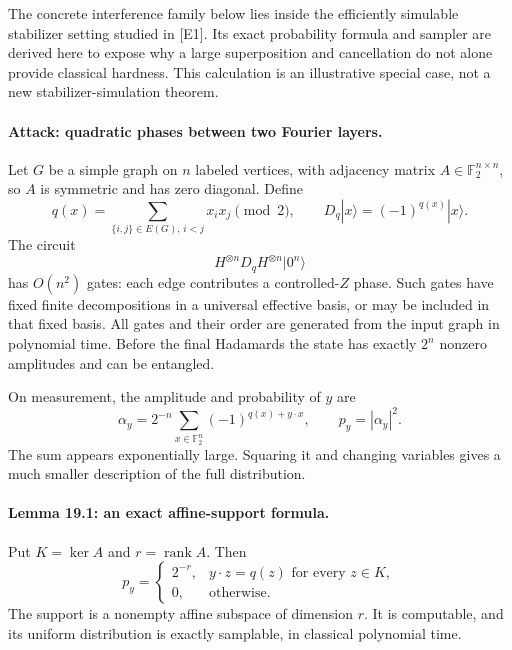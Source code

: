 \documentclass[11pt]{article}
\begin{document}
The concrete interference family below lies inside the efficiently simulable
stabilizer setting studied in [E1]. Its exact probability formula and sampler
are derived here to expose why a large superposition and cancellation do not
alone provide classical hardness. This calculation is an illustrative
special case, not a new stabilizer-simulation theorem.

\paragraph{Attack: quadratic phases between two Fourier layers.}
Let $G$ be a simple graph on $n$ labeled vertices, with adjacency matrix
$A\in\mathbb F_2^{n\times n}$, so $A$ is symmetric and has zero diagonal.
Define
\[
 q(x)=\sum_{\{i,j\}\in E(G),\,i<j}x_i x_j\pmod2,
 \qquad D_q|x\rangle=(-1)^{q(x)}|x\rangle.
\]
The circuit
\[
                 H^{\otimes n}D_qH^{\otimes n}|0^n\rangle
\]
has $O(n^2)$ gates: each edge contributes a controlled-$Z$ phase. Such gates
have fixed finite decompositions in a universal effective basis, or may be
included in that fixed basis. All gates and their order are generated from
the input graph in polynomial time. Before the final Hadamards the state has
exactly $2^n$ nonzero amplitudes and can be entangled.

On measurement, the amplitude and probability of $y$ are
\begin{equation}\label{a19:fourier}
 \alpha_y=2^{-n}\sum_{x\in\mathbb F_2^n}(-1)^{q(x)+y\cdot x},
 \qquad p_y=|\alpha_y|^2.
\end{equation}
The sum appears exponentially large. Squaring it and changing variables
gives a much smaller description of the full distribution.

\paragraph{Lemma 19.1: an exact affine-support formula.}
Put $K=\ker A$ and $r=\operatorname{rank}A$. Then
\begin{equation}\label{a19:distribution}
 p_y=
 \begin{cases}
  2^{-r},&y\cdot z=q(z)\text{ for every }z\in K,\\
  0,&\text{otherwise}.
 \end{cases}
\end{equation}
The support is a nonempty affine subspace of dimension $r$. It is computable,
and its uniform distribution is exactly samplable, in classical polynomial
time.
\end{document}

